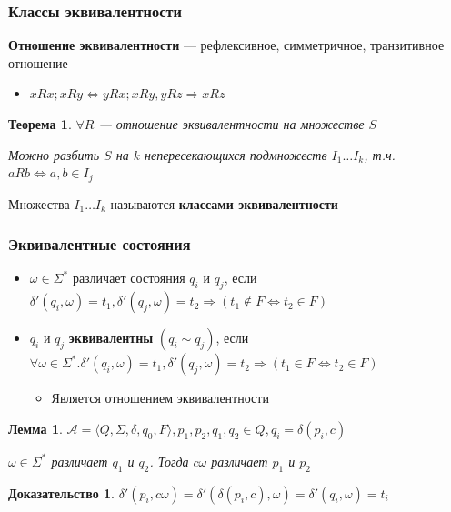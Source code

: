 \documentclass{beamer}
\newtheorem{rutheorem}{Теорема}
\newtheorem{ruproof}{Доказательство}
\newtheorem{rulemma}{Лемма}
\begin{document}
\begin{frame}[fragile]
  \transwipe[direction=90]
  \frametitle{Классы эквивалентности}
    \textbf{Отношение эквивалентности} --- рефлексивное, симметричное, транзитивное отношение
    \begin{itemize}
      \item $xRx; xRy \Leftrightarrow yRx; xRy, yRz \Rightarrow xRz$
    \end{itemize}
    
    \begin{rutheorem}
       $\forall R$ --- отношение эквивалентности на множестве $S$
      
      Можно разбить $S$ на $k$ непересекающихся подмножеств $I_1 \dots I_k$, т.ч. $aRb \Leftrightarrow a, b \in I_j$
    \end{rutheorem}
    
    Множества $I_1 \dots I_k$ называются \textbf{классами эквивалентности}
\end{frame}

\begin{frame}[fragile]
  \transwipe[direction=90]
  \frametitle{Эквивалентные состояния}
  \begin{itemize}
    \item $\omega \in \Sigma^*$ различает состояния $q_i$ и $q_j$, если $\delta' (q_i, \omega) = t_1, \delta' (q_j, \omega) = t_2 \Rightarrow (t_1 \notin F \Leftrightarrow t_2 \in F)$
    \item $q_i$ и $q_j$ \textbf{эквивалентны} $(q_i \sim q_j)$, если $\forall \omega \in \Sigma^*. \delta' (q_i, \omega) = t_1, \delta' (q_j, \omega) = t_2 \Rightarrow (t_1 \in F \Leftrightarrow t_2 \in F)$
    \begin{itemize}
      \item Является отношением эквивалентности
    \end{itemize}
  \end{itemize}
   \begin{rulemma}
      $\mathcal{A} = \langle Q, \Sigma, \delta, q_0, F \rangle, p_1, p_2, q_1, q_2 \in Q, q_i = \delta(p_i, c)$
      
      $\omega \in \Sigma^*$ различает $q_1$ и $q_2$. Тогда $c \omega$ различает $p_1$ и $p_2$
   \end{rulemma}
   
   \begin{ruproof}
     $\delta' (p_i, c \omega) = \delta' (\delta (p_i, c), \omega) = \delta' (q_i, \omega) = t_i$
   \end{ruproof}
\end{frame}
\end{document}
